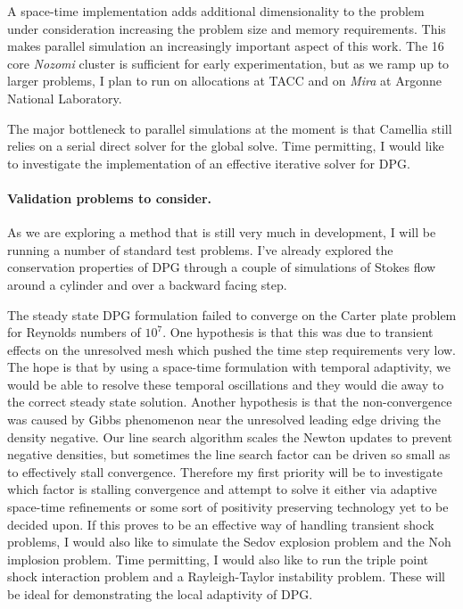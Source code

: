 \documentclass[letterpaper,12pt]{article}
\begin{document}
A space-time implementation adds additional dimensionality to the problem under consideration increasing the problem size and memory requirements.
This makes parallel simulation an increasingly important aspect of this work.
The 16 core \emph{Nozomi} cluster is sufficient for early experimentation, but as we ramp up to larger problems, 
I plan to run on allocations at TACC and on \emph{Mira} at Argonne National Laboratory.

The major bottleneck to parallel simulations at the moment is that Camellia still relies on a serial direct solver for the global solve.
Time permitting, I would like to investigate the implementation of an effective iterative solver for DPG.

\paragraph{Validation problems to consider.}
As we are exploring a method that is still very much in development, I will be running a number of standard test problems.
I've already explored the conservation properties of DPG through a couple of simulations of Stokes flow around a cylinder and over
a backward facing step.

The steady state DPG formulation failed to converge on the Carter plate problem for Reynolds numbers of $10^7$. 
One hypothesis is that this was due to transient effects on the unresolved mesh which pushed the time step requirements very low.
The hope is that by using a space-time formulation with temporal adaptivity, we would be able to resolve these temporal oscillations
and they would die away to the correct steady state solution.
Another hypothesis is that the non-convergence was caused by Gibbs phenomenon near the unresolved leading edge driving the density negative.
Our line search algorithm scales the Newton updates to prevent negative densities, but sometimes the line search factor can be driven so small
as to effectively stall convergence.
Therefore my first priority will be to investigate which factor is stalling convergence and attempt to solve it either via adaptive space-time
refinements or some sort of positivity preserving technology yet to be decided upon.
If this proves to be an effective way of handling transient shock problems, 
I would also like to simulate the Sedov explosion problem and the Noh implosion problem.
Time permitting, I would also like to run the triple point shock interaction problem and a Rayleigh-Taylor instability problem.
These will be ideal for demonstrating the local adaptivity of DPG.
\end{document}
